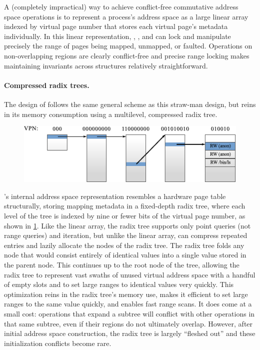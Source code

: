 A (completely impractical) way to achieve conflict-free commutative
address space
operations is to represent a process's address space as a large linear
array indexed by virtual page number that stores each virtual page's
metadata individually.
%
In this linear representation, , ,
and  can lock and manipulate precisely the range of
pages being mapped, unmapped, or faulted.
%
Operations on non-overlapping regions are clearly conflict-free and
precise range locking makes maintaining invariants across structures
relatively straightforward.

\paragraph{Compressed radix trees.}
The design of \vm follows the same general
scheme as this straw-man design, but reins in its memory consumption
using a multilevel, compressed radix tree.

\begin{figure}
  \centering
  \includegraphics{figures/radix.pdf}
  \label{fig:radix}
\end{figure}

\vm's internal address space representation resembles a hardware page table
structurally, storing mapping metadata in a fixed-depth radix tree,
where each level of the tree is indexed by nine or fewer bits of the
virtual page number, as shown in \cref{fig:radix}.  Like the linear array,
the radix tree supports only point queries (not range queries) and
iteration, but unlike the linear array, \vm can compress repeated
entries and lazily allocate the nodes of the radix tree.
%
The radix tree folds any node that would consist entirely of identical
values into a single value stored in the parent node.  This continues up to
the root node of the tree, allowing the radix tree to represent vast
swaths of unused virtual address space with a handful of empty slots
and to set large ranges to identical values very quickly.
%
This optimization reins in the radix tree's memory use, makes it
efficient to set large ranges to the same value quickly, and enables
fast range scans.
%
It does come at a small cost: operations that expand a subtree will
conflict with other operations in that same subtree, even if their
regions do not ultimately overlap.  However, after initial address
space construction, the radix tree is largely ``fleshed out'' and
these initialization conflicts become rare.

